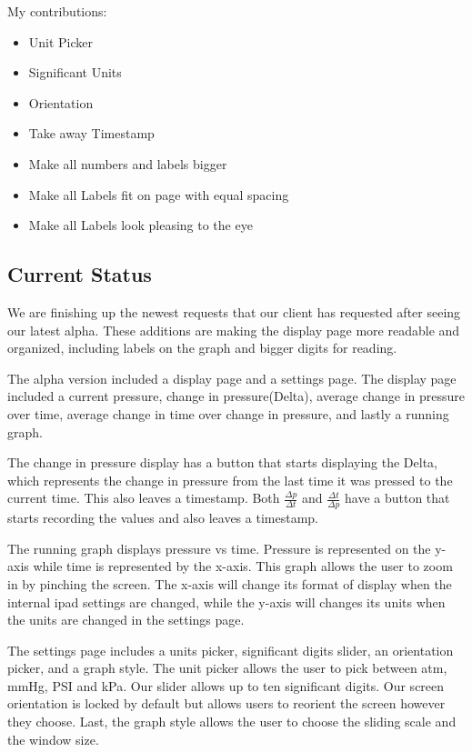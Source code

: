 \documentclass[onecolumn, draftclsnofoot,10pt, compsoc]{IEEEtran}
\begin{document}
  My contributions:
  \begin{itemize}
    \item Unit Picker
   \item  Significant Units
    \item Orientation
    \item Take away Timestamp
    \item Make all numbers and labels bigger
    \item Make all Labels fit on page with equal spacing
    \item Make all Labels look pleasing to the eye
    \end{itemize}

\subsection{Current Status}
  We are finishing up the newest requests that our client has requested after seeing our latest alpha.
  These additions are making the display page more readable and organized, including labels on the graph and bigger digits for reading.
  
    The alpha version included a display page and a settings page. 
    The display page included a current pressure, change in pressure(Delta), average change in pressure over time, average change in time over change in pressure, and lastly a running graph. 
    
  The change in pressure display has a button that starts displaying the Delta, which represents the change in pressure from the last time it was pressed to the current time. 
  This also leaves a timestamp. 
  Both $\frac{\Delta p}{\Delta t}$ and $\frac{\Delta t}{\Delta p}$ have a button that starts recording the values and also leaves a timestamp.
  
    The running graph displays pressure vs time.
    Pressure is represented on the y-axis while time is represented by the x-axis. 
    This graph allows the user to zoom in by pinching the screen. 
    The x-axis will change its format of display when the internal ipad settings are changed, while the y-axis will changes its units when the units are changed in the settings page.
    
    The settings page includes a units picker, significant digits slider, an orientation picker, and a graph style.
    The unit picker allows the user to pick between atm, mmHg, PSI and kPa. 
    Our slider allows up to ten significant digits.
    Our screen orientation is locked by default but allows users to reorient the screen however they choose. 
    Last, the graph style allows the user to choose the sliding scale and the window size. 
\end{document}
